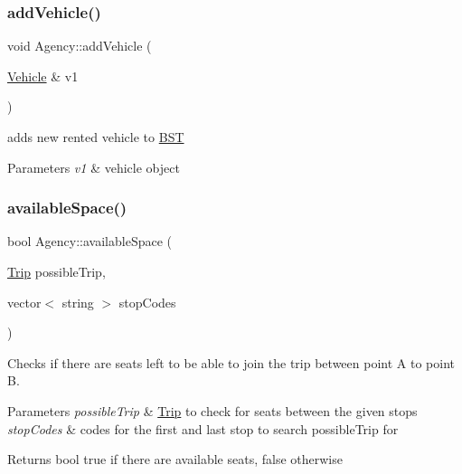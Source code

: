 \subsubsection{\texorpdfstring{add\+Vehicle()}{addVehicle()}}
{\footnotesize\ttfamily void Agency\+::add\+Vehicle (\begin{DoxyParamCaption}\item[{\hyperlink{class_vehicle}{Vehicle} \&}]{v1 }\end{DoxyParamCaption})\hspace{0.3cm}{\ttfamily [inline]}}



adds new rented vehicle to \hyperlink{class_b_s_t}{B\+ST} 


\begin{DoxyParams}{Parameters}
{\em v1} & vehicle object \\
\hline
\end{DoxyParams}
\mbox{\label{class_agency_a9defb73f53ce32bc6382843dd46fc464}} 
\subsubsection{\texorpdfstring{available\+Space()}{availableSpace()}}
{\footnotesize\ttfamily bool Agency\+::available\+Space (\begin{DoxyParamCaption}\item[{\hyperlink{class_trip}{Trip}}]{possible\+Trip,  }\item[{vector$<$ string $>$}]{stop\+Codes }\end{DoxyParamCaption})}



Checks if there are seats left to be able to join the trip between point A to point B. 


\begin{DoxyParams}{Parameters}
{\em possible\+Trip} & \hyperlink{class_trip}{Trip} to check for seats between the given stops \\
\hline
{\em stop\+Codes} & codes for the first and last stop to search possible\+Trip for\\
\hline
\end{DoxyParams}
\begin{DoxyReturn}{Returns}
bool true if there are available seats, false otherwise 
\end{DoxyReturn}
\mbox{\label{class_agency_a892474fd8930e8e78e743e2b185b35ac}} 
